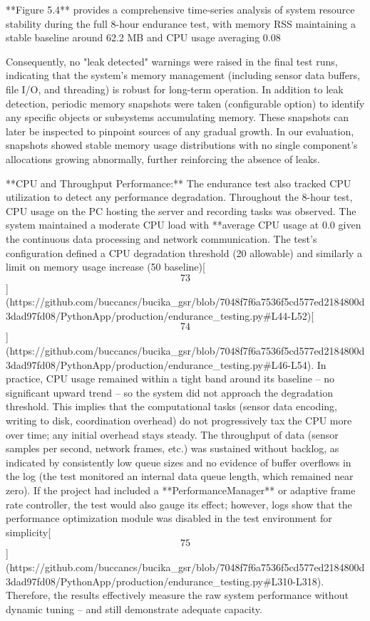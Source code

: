 \documentclass[12pt,a4paper]{article}
\begin{document}
{**Figure 5.4** provides a comprehensive time-series analysis of system resource stability during the full 8-hour endurance test, with memory RSS maintaining a stable baseline around 62.2 MB and CPU usage averaging 0.08%

Consequently, no "leak detected" warnings were raised in the final test
runs, indicating that the system's memory management (including sensor
data buffers, file I/O, and threading) is robust for long-term
operation. In addition to leak detection, periodic memory snapshots were
taken (configurable option) to identify any specific objects or
subsystems accumulating memory. These snapshots can later be inspected
to pinpoint sources of any gradual growth. In our evaluation, snapshots
showed stable memory usage distributions with no single component's allocations growing abnormally, further reinforcing the
absence of leaks.

**CPU and Throughput Performance:** The endurance test also tracked CPU
utilization to detect any performance degradation. Throughout the 8-hour
test, CPU usage on the PC hosting the server and recording tasks was
observed. The system maintained a moderate CPU load with **average CPU usage at 0.0%
given the continuous data processing and network communication. The
test's configuration defined a CPU degradation threshold (20%
allowable) and similarly a limit on memory usage increase (50%
baseline)[\[73\]](https://github.com/buccancs/bucika_gsr/blob/7048f7f6a7536f5cd577ed2184800d3dad97fd08/PythonApp/production/endurance_testing.py#L44-L52)[\[74\]](https://github.com/buccancs/bucika_gsr/blob/7048f7f6a7536f5cd577ed2184800d3dad97fd08/PythonApp/production/endurance_testing.py#L46-L54).
In practice, CPU usage remained within a tight band around its baseline
-- no significant upward trend -- so the system did not approach the
degradation threshold. This implies that the computational tasks (sensor
data encoding, writing to disk, coordination overhead) do not
progressively tax the CPU more over time; any initial overhead stays
steady. The throughput of data (sensor samples per second, network
frames, etc.) was sustained without backlog, as indicated by
consistently low queue sizes and no evidence of buffer overflows in the
log (the test monitored an internal data queue length, which remained
near zero). If the project had included a **PerformanceManager** or
adaptive frame rate controller, the test would also gauge its effect;
however, logs show that the performance optimization module was disabled
in the test environment for
simplicity[\[75\]](https://github.com/buccancs/bucika_gsr/blob/7048f7f6a7536f5cd577ed2184800d3dad97fd08/PythonApp/production/endurance_testing.py#L310-L318).
Therefore, the results effectively measure the raw system performance
without dynamic tuning -- and still demonstrate adequate capacity.

}
\end{document}
